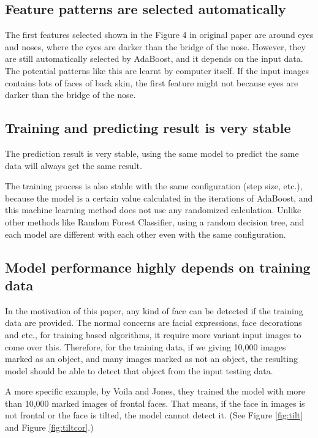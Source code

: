 \documentclass[10pt,twocolumn,letterpaper]{article}
\begin{document}
\subsection{Feature patterns are selected automatically}
The first features selected shown in the Figure 4 in original paper are around eyes and noses, where the eyes are darker than the bridge of the nose.
However, they are still automatically selected by AdaBoost, and it depends on the input data. The potential patterns like this are learnt by computer itself.
If the input images contains lots of faces of back skin, the first feature might not because eyes are darker than the bridge of the nose.

\subsection{Training and predicting result is very stable}
The prediction result is very stable, using the same model to predict the same data will always get the same result.

The training process is also stable with the same configuration (step size, etc.),
because the model is a certain value calculated in the iterations of AdaBoost,
and this machine learning method does not use any randomized calculation.
Unlike other methods like Random Forest Classifier, using a random decision tree,
and each model are different with each other even with the same configuration.

\subsection{Model performance highly depends on training data}
In the motivation of this paper, any kind of face can be detected if the training data are provided.
The normal concerns are facial expressions, face decorations and etc., for training based algorithms, it require more variant input images to come over this.
Therefore, for the training data, if we giving 10,000 images marked as an object, and many images marked as not an object,
the resulting model should be able to detect that object from the input testing data.

A more specific example, by Voila and Jones, they trained the model with more than 10,000 marked images of frontal faces.
That means, if the face in images is not frontal or the face is tilted, the model cannot detect it. (See Figure \ref{fig:tilt} and Figure \ref{fig:tiltcor}.)
\end{document}
